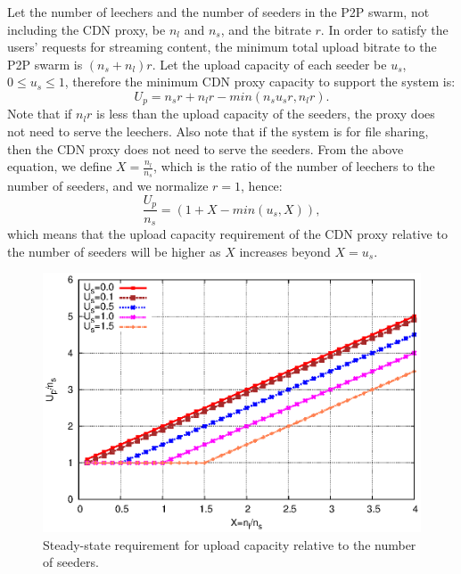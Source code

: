 \documentclass[paper]{ieice}
\begin{document}
Let the number of leechers and the number of seeders in the P2P swarm,
not including the CDN proxy, be $n_l$ and $n_s$, and the bitrate $r$.
In order to satisfy the users' requests for streaming content, the
minimum total upload bitrate to the P2P swarm is $(n_s + n_l)r$.  Let
the upload capacity of each seeder be $u_s$, $0 \leq u_s \leq 1$,
therefore the minimum CDN proxy capacity to support the system is:
\begin{equation}
        U_p = n_sr + n_lr - min(n_su_sr, n_lr).
\end{equation}
Note that if $n_lr$ is less than the upload capacity of the seeders, the proxy does not need to serve the leechers.
Also note that if the system is for file sharing, then the CDN proxy does not need to serve the seeders.
From the above equation, we define $X=\frac{n_l}{n_s}$, which is the ratio of the number of leechers to the number of seeders, and we normalize $r=1$, hence:
\begin{equation}
        \frac{U_p}{n_s} = (1 + X - min (u_s,X)),
\end{equation}
which means that the upload capacity requirement of the CDN proxy relative to the number of seeders will be higher as $X$ increases beyond $X = u_s$.

\begin{figure}[hb] 
\begin{center}
\includegraphics[scale=0.5]{graphs/stable-steady-state.eps}
\end{center}
\caption{Steady-state requirement for upload capacity relative to the
  number of seeders.}
\label{fig:steadystate}
\vspace{-2mm}
\end{figure}
\end{document}
